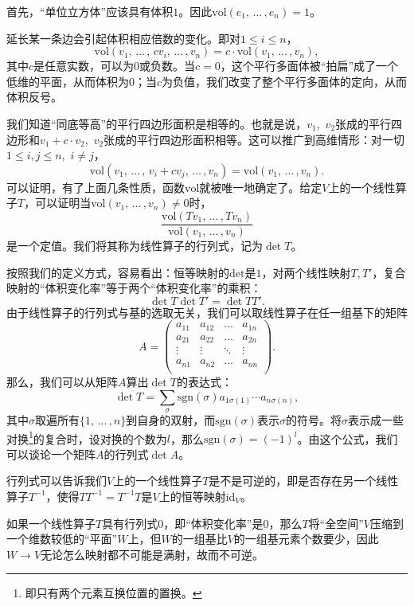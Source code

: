 首先，“单位立方体”应该具有体积$1$。因此$\mathrm{vol}(e_1,\,\dots\,,e_n)=1$。

延长某一条边会引起体积相应倍数的变化。即对$1\leq i\leq n$，
\[\mathrm{vol}(v_1,\,\dots\,,\,cv_i,\,\dots\,,v_n)=c\cdot \mathrm{vol}(v_1,\,\dots\,,v_n),\]
其中$c$是任意实数，可以为$0$或负数。当$c=0$，这个平行多面体被“拍扁”成了一个低维的平面，从而体积为$0$；当$c$为负值，我们改变了整个平行多面体的定向，从而体积反号。

我们知道“同底等高”的平行四边形面积是相等的。也就是说，$v_1$,~$v_2$张成的平行四边形和$v_1+c\cdot v_2$,~$v_2$张成的平行四边形面积相等。这可以推广到高维情形：对一切$1\leq i,j\leq n$,~$i\neq j$，
\[\mathrm{vol}(v_1,\,\dots\,,\,v_i+c v_j,\,\dots\,,v_n)=\mathrm{vol}(v_1,\,\dots\,,v_n).\]
可以证明，有了上面几条性质，函数$\mathrm{vol}$就被唯一地确定了。给定$V$上的一个线性算子$T$，可以证明当$\mathrm{vol}(v_1,\,\dots\,,v_n)\neq 0$时，
\[\frac{\mathrm{vol}(Tv_1,\,\dots\,,Tv_n)}{\mathrm{vol}(v_1,\,\dots\,,v_n)}\]
是一个定值。我们将其称为线性算子的行列式，记为$\det T$。

按照我们的定义方式，容易看出：恒等映射的$\mathrm{det}$是$1$，对两个线性映射$T,T'$，复合映射的“体积变化率”等于两个“体积变化率”的乘积：
\[\det T\det T'=\det TT'.\]
由于线性算子的行列式与基的选取无关，我们可以取线性算子在任一组基下的矩阵
\[A =
    \begin{pmatrix}
        a_{11} & a_{12} & \ldots & a_{1n} \\
        a_{21} & a_{22} & \ldots & a_{2n} \\
        \vdots & \vdots & \ddots & \vdots \\
        a_{n1} & a_{n2} & \ldots & a_{nn} \\
    \end{pmatrix}. \]
那么，我们可以从矩阵$A$算出$\det T$的表达式：
\[\det T=\sum_{\sigma}\mathrm{sgn}(\sigma)a_{1\sigma(1)}\cdots a_{n\sigma(n)},\]
其中$\sigma$取遍所有$\{1,\,\dots\,,n\}$到自身的双射，而$\mathrm{sgn}(\sigma)$表示$\sigma$的符号。将$\sigma$表示成一些对换\footnote{即只有两个元素互换位置的置换。}的复合时，设对换的个数为$l$，那么$\mathrm{sgn}(\sigma)=(-1)^l$。由这个公式，我们可以谈论一个矩阵$A$的行列式$\det A$。

行列式可以告诉我们$V$上的一个线性算子$T$是不是可逆的，即是否存在另一个线性算子$T^{-1}$，使得$TT^{-1}=T^{-1}T$是$V$上的恒等映射$\mathrm{id}_V$。

如果一个线性算子$T$具有行列式$0$，即“体积变化率”是$0$，那么$T$将“全空间”$V$压缩到一个维数较低的“平面”$W$上，但$W$的一组基比$V$的一组基元素个数要少，因此$W\to V$无论怎么映射都不可能是满射，故而不可逆。


